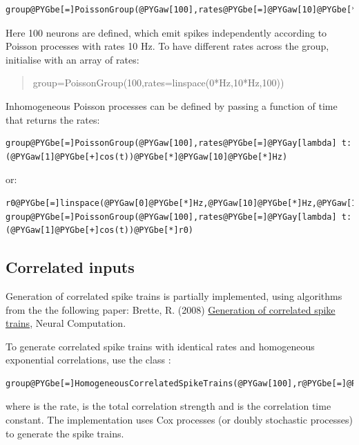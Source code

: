 \documentclass[letterpaper,10pt]{manual}
\begin{document}
\begin{Verbatim}[commandchars=@\[\]]
group@PYGbe[=]PoissonGroup(@PYGaw[100],rates@PYGbe[=]@PYGaw[10]@PYGbe[*]Hz)
\end{Verbatim}

Here 100 neurons are defined, which emit spikes independently according to Poisson
processes with rates 10 Hz. To have different rates across the group,
initialise with an array of rates:
\begin{quote}

group=PoissonGroup(100,rates=linspace(0*Hz,10*Hz,100))
\end{quote}

Inhomogeneous Poisson processes can be defined by passing a function of time that returns the
rates:

\begin{Verbatim}[commandchars=@\[\]]
group@PYGbe[=]PoissonGroup(@PYGaw[100],rates@PYGbe[=]@PYGay[lambda] t:(@PYGaw[1]@PYGbe[+]cos(t))@PYGbe[*]@PYGaw[10]@PYGbe[*]Hz)
\end{Verbatim}

or:

\begin{Verbatim}[commandchars=@\[\]]
r0@PYGbe[=]linspace(@PYGaw[0]@PYGbe[*]Hz,@PYGaw[10]@PYGbe[*]Hz,@PYGaw[100])
group@PYGbe[=]PoissonGroup(@PYGaw[100],rates@PYGbe[=]@PYGay[lambda] t:(@PYGaw[1]@PYGbe[+]cos(t))@PYGbe[*]r0)
\end{Verbatim}


\subsection{Correlated inputs}

Generation of correlated spike trains is partially implemented, using algorithms from the
the following paper: Brette, R. (2008) \href{http://www.di.ens.fr/\textasciitilde{}brette/papers/Brette2008NC.html}{Generation of correlated spike trains}, Neural Computation.

To generate correlated spike trains with identical rates and homogeneous exponential correlations,
use the class :

\begin{Verbatim}[commandchars=@\[\]]
group@PYGbe[=]HomogeneousCorrelatedSpikeTrains(@PYGaw[100],r@PYGbe[=]@PYGaw[10]@PYGbe[*]Hz,c@PYGbe[=]@PYGaw[0.1],tauc@PYGbe[=]@PYGaw[10]@PYGbe[*]ms)
\end{Verbatim}

where  is the rate,  is the total correlation strength and  is the correlation time constant.
The implementation uses Cox processes (or doubly stochastic processes) to generate the spike trains.
\end{document}
